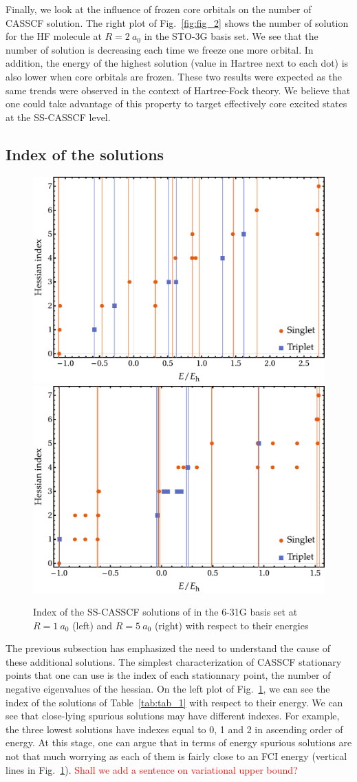 \documentclass[aps,prb,reprint,showkeys,superscriptaddress]{revtex4-1}
\newcommand{\todo}[1]{\textcolor{red}{#1}}
\begin{document}
Finally, we look at the influence of frozen core orbitals on the number of CASSCF solution.
The right plot of Fig.~\ref{fig:fig_2} shows the number of solution for the HF molecule at $R=2~a_0$ in the STO-3G basis set.
We see that the number of solution is decreasing each time we freeze one more orbital.
In addition, the energy of the highest solution (value in Hartree next to each dot) is also lower when core orbitals are frozen.
These two results were expected as the same trends were observed in the context of Hartree-Fock theory. \cite{Dong_2020}
We believe that one could take advantage of this property to target effectively core excited states at the SS-CASSCF level.

\subsection{Index of the solutions}
\label{sec:geom}

\begin{figure}
  \includegraphics[width=0.4\linewidth]{Figures/fig_3a.pdf}
  \hspace{0.05\linewidth}
  \includegraphics[width=0.4\linewidth]{Figures/fig_3b.pdf}
  \caption{Index of the SS-CASSCF solutions of  in the 6-31G basis set at $R=1~a_0$ (left) and $R=5~a_0$ (right) with respect to their energies
    \label{fig:fig_3}}
\end{figure}

The previous subsection has emphasized the need to understand the cause of these additional solutions.
The simplest characterization of CASSCF stationary points that one can use is the index of each stationnary point, \ie the number of negative eigenvalues of the hessian.
On the left plot of Fig.~\ref{fig:fig_3}, we can see the index of the solutions of Table~\ref{tab:tab_1} with respect to their energy.
We can see that close-lying spurious solutions may have different indexes.
For example, the three lowest solutions have indexes equal to 0, 1 and 2 in ascending order of energy.
At this stage, one can argue that in terms of energy spurious solutions are not that much worrying as each of them is fairly close to an FCI energy (vertical lines in  Fig.~\ref{fig:fig_3}).
\todo{Shall we add a sentence on variational upper bound?}
\end{document}
